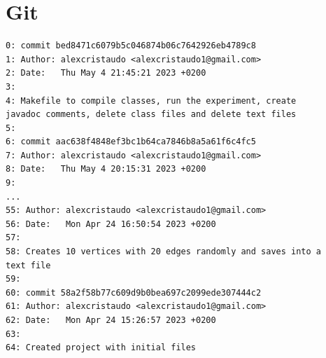 \documentclass{assignment}
\begin{document}
\section{Git}
\begin{BVerbatim}
0: commit bed8471c6079b5c046874b06c7642926eb4789c8
1: Author: alexcristaudo <alexcristaudo1@gmail.com>
2: Date:   Thu May 4 21:45:21 2023 +0200
3:
4: Makefile to compile classes, run the experiment, create 
javadoc comments, delete class files and delete text files
5:
6: commit aac638f4848ef3bc1b64ca7846b8a5a61f6c4fc5
7: Author: alexcristaudo <alexcristaudo1@gmail.com>
8: Date:   Thu May 4 20:15:31 2023 +0200
9:
...
55: Author: alexcristaudo <alexcristaudo1@gmail.com>
56: Date:   Mon Apr 24 16:50:54 2023 +0200
57:
58: Creates 10 vertices with 20 edges randomly and saves into a 
text file
59:
60: commit 58a2f58b77c609d9b0bea697c2099ede307444c2
61: Author: alexcristaudo <alexcristaudo1@gmail.com>
62: Date:   Mon Apr 24 15:26:57 2023 +0200
63:
64: Created project with initial files
\end{BVerbatim}
\end{document}
